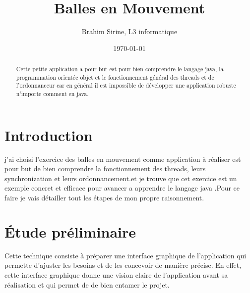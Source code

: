 \documentclass{article}
\title{Balles en Mouvement}
\author{Brahim Sirine, L3 informatique}
\date{\today}
\begin{document}
\maketitle %


\begin{abstract}
Cette petite application a pour but est pour bien comprendre le langage java, la programmation orientée objet et le fonctionnement général des threads \cite{thread} et de l'ordonnanceur car en général il est impossible de développer une application robuste n'importe comment en java.
\end{abstract}

\section{Introduction}
\label{section:hello} %
j'ai choisi l'exercice des balles en mouvement comme application à réaliser est pour but de bien comprendre la fonctionnement des threads, leurs synchronization et leurs ordonnancement.et je trouve que cet exercice est un exemple concret et efficace pour avancer a apprendre le langage java .Pour ce faire je vais détailler tout les étapes de mon propre raisonnement.
 

\section{\'Etude préliminaire}
Cette technique consiste à préparer une interface graphique de l'application qui permette d'ajuster les besoins et de les concevoir de manière précise. En effet, cette interface graphique donne une vision claire de l'application avant sa réalisation et qui permet de de bien entamer le projet.
\end{document}
